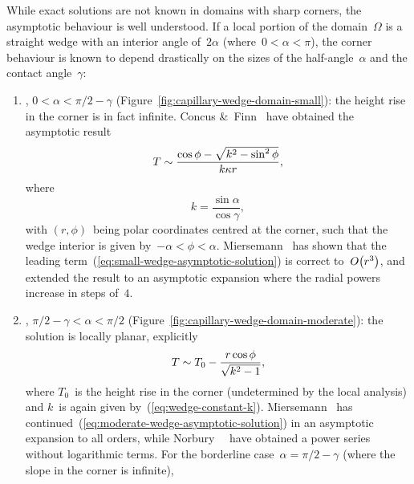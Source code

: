 While exact solutions are not known in domains with sharp corners,
the asymptotic behaviour is well understood.
If a local portion of the domain~$\Omega$
is a straight wedge with an interior angle of~$2 \alpha$
(where~$0 < \alpha < \pi$),
the corner behaviour is known to depend drastically
on the sizes of the half-angle~$\alpha$ and the contact angle~$\gamma$:
\begin{enumerate}
  \item
    , $0 < \alpha < \pi/2 - \gamma$
    (Figure~\ref{fig:capillary-wedge-domain-small}):
    the height rise in the corner is in fact infinite.
    Concus \&~Finn~\cite{concus-1970-class-capillary-surfaces}
    have obtained the asymptotic result
    \begin{equation}
      T \sim \frac{\cos\phi - \sqrt{k^2 - \sin^2 \phi}}{k \kappa r},
      \label{eq:small-wedge-asymptotic-solution}
    \end{equation}
    where
    \begin{equation}
      k = \frac{\sin\alpha}{\cos\gamma},
      \label{eq:wedge-constant-k}
    \end{equation}
    with $(r, \phi)$~being polar coordinates centred at the corner,
    such that the wedge interior is given by~$-\alpha < \phi < \alpha$.
    Miersemann~\cite{miersemann-1993-asymptotic-corner-capillary-singular}
    has shown that the leading term~(\ref{eq:small-wedge-asymptotic-solution})
    is correct to~$\order \roundbr*{r^3}$,
    and extended the result to an asymptotic expansion
    where the radial powers increase in steps of~$4$.
  \item
    , $\pi/2 - \gamma < \alpha < \pi/2$
    (Figure~\ref{fig:capillary-wedge-domain-moderate}):
    the solution is locally planar,
    explicitly
    \begin{equation}
      T \sim T_0 - \frac{r \cos\phi}{\sqrt{k^2 - 1}},
      \label{eq:moderate-wedge-asymptotic-solution}
    \end{equation}
    where $T_0$~is the height rise in the corner
    (undetermined by the local analysis)
    and $k$~is again given by~(\ref{eq:wedge-constant-k}).
    Miersemann~\cite{miersemann-1988-asymptotic-expansion-corner-capillary}
    has continued~(\ref{eq:moderate-wedge-asymptotic-solution})
    in an asymptotic expansion to all orders,
    while Norbury~\etal~\cite{norbury-2005-corner-solutions-laplace-young}
    have obtained a power series without logarithmic terms.
    For the borderline case~$\alpha = \pi/2 - \gamma$
    (where the slope in the corner is infinite),

\end{enumerate}
